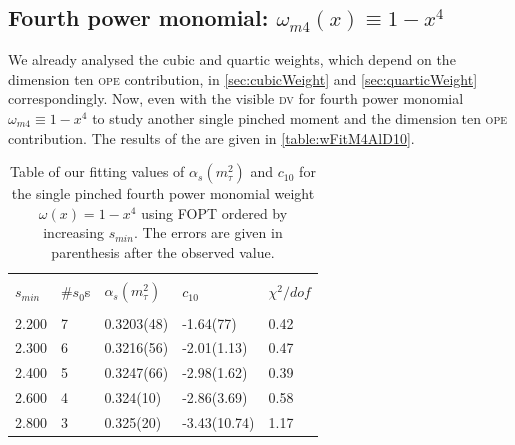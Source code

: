 \documentclass[../../index.tex]{subfiles}
\begin{document}
\subsection{Fourth power monomial: $\omega_{m4}(x) \equiv
  1-x^4$}
We already analysed the cubic and quartic weights, which depend on the
dimension ten \textsc{ope} contribution, in \cref{sec:cubicWeight}
and \cref{sec:quarticWeight} correspondingly. Now, even with the visible
\textsc{dv} for
fourth power monomial $\omega_{m4}\equiv 1-x^4$ to study another single pinched moment and the dimension
ten \textsc{ope} contribution. The results of the are given in \cref{table:wFitM4AlD10}. 
\begin{table}
  \centering
  \begin{tabular}{lllll}
    \toprule \\
    $s_{min}$ & \#$s_0$s & $\alpha_s(m_\tau^2)$ & $c_{10}$ & $\chi^2/dof$  \\
    \hline \\
    2.200 & 7  & 0.3203(48) & -1.64(77) & 0.42 \\
    2.300 & 6  & 0.3216(56) & -2.01(1.13) & 0.47 \\
    2.400 & 5  & 0.3247(66) & -2.98(1.62) & 0.39 \\
    2.600 & 4  & 0.324(10) & -2.86(3.69) & 0.58 \\
    2.800 & 3  & 0.325(20) & -3.43(10.74) & 1.17 \\
    \bottomrule
  \end{tabular}
  \caption{Table of our fitting values of $\alpha_s(m_\tau^2)$ and $c_{10}$
    for the single pinched fourth power monomial weight $\omega(x)=1-x^4$ using FOPT ordered
    by increasing $s_{min}$. The errors are given in parenthesis after the observed value.}
  \label{table:fitM4AlD10}
\end{table}
\end{document}
